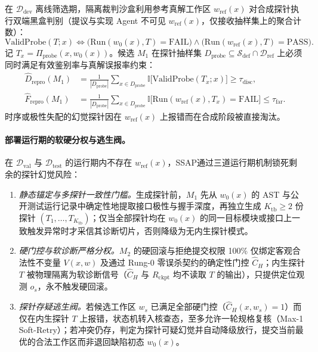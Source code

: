\documentclass[UTF8,a4paper,10.5pt]{ctexart}
\newcommand{\method}{SSAP}
\newcommand{\Ddev}{\mathcal{D}_{\mathrm{dev}}}
\newcommand{\Dval}{\mathcal{D}_{\mathrm{val}}}
\newcommand{\Dtest}{\mathcal{D}_{\mathrm{test}}}
\newcommand{\Ind}{\mathbb{I}}
\begin{document}
在 $\Ddev$ 离线筛选期，隔离裁判沙盒利用参考真解工作区 $w_{\mathrm{ref}}(x)$ 对合成探针执行双端黑盒判别（提议与实现 Agent 不可见 $w_{\mathrm{ref}}(x)$，仅接收抽样集上的聚合计数）：
\begin{equation}
  \mathrm{ValidProbe}(T; x) \iff
  \bigl(\mathrm{Run}(w_0(x), T) = \mathrm{FAIL}\bigr) \land
  \bigl(\mathrm{Run}(w_{\mathrm{ref}}(x), T) = \mathrm{PASS}\bigr).
  \label{eq:validprobe}
\end{equation}
记 $T_x=\Pi_{\mathrm{probe}}(x,w_0(x))$。候选 $M_1$ 在探针抽样集 $D_{\mathrm{probe}}\subseteq\mathcal{S}_{\mathrm{def}}\cap\mathcal{D}_{\mathrm{ref}}$ 上必须同时满足有效鉴别率与真解误报率约束：
\begin{align}
  \hat{D}_{\mathrm{repro}}(M_1) &= \frac{1}{|D_{\mathrm{probe}}|}\sum_{x\in D_{\mathrm{probe}}}\Ind\bigl[\mathrm{ValidProbe}(T_x;x)\bigr] \ge \tau_{\mathrm{disc}}, \\
  \hat{F}_{\mathrm{repro}}(M_1) &= \frac{1}{|D_{\mathrm{probe}}|}\sum_{x\in D_{\mathrm{probe}}}\Ind\bigl[\mathrm{Run}(w_{\mathrm{ref}}(x),T_x)=\mathrm{FAIL}\bigr] \le \tau_{\mathrm{far}}.
\end{align}
时序或极性失配的幻觉探针因在 $w_{\mathrm{ref}}(x)$ 上报错而在合成阶段被直接淘汰。

\paragraph{部署运行期的软硬分权与逃生阀。}
在 $\Dval$ 与 $\Dtest$ 的运行期内不存在 $w_{\mathrm{ref}}(x)$，\method{}通过三道运行期机制锁死剩余的探针幻觉风险：
\begin{enumerate}
  \item \emph{静态锚定与多探针一致性门槛。}生成探针前，$M_1$ 先从 $w_0(x)$ 的 AST 与公开测试运行记录中确定性地提取接口极性与握手深度，再独立生成 $K_{\mathrm{tb}}\ge 2$ 份探针 $(T_1,\dots,T_{K_{\mathrm{tb}}})$；仅当全部探针均在 $w_0(x)$ 的同一目标模块或接口上一致触发异常时才采信其诊断切片，否则降级为无内生探针模式。
  \item \emph{硬门控与软诊断严格分权。}$M_2$ 的硬回滚与拒绝提交权限 100\% 仅绑定客观合法性不变量 $V(x,w)$ 及通过 Rung-0 零误杀契约的确定性门控 $\hat{C}_H$；内生探针 $T$ 被物理隔离为软诊断信号（$\hat{C}_H$ 与 $R_{\mathrm{ckpt}}$ 均不读取 $T$ 的输出），只提供定位观测 $o_s$，永不触发硬回滚。
  \item \emph{探针存疑逃生阀。}若候选工作区 $w_s$ 已满足全部硬门控（$\hat{C}_H(x,w_s)=1$）而仅在内生探针 $T$ 上报错，状态机转入核查态，至多允许一轮规格复核（Max-1 Soft-Retry）；若冲突仍存，判定为探针可疑幻觉并自动降级放行，提交当前最优的合法工作区而非退回缺陷初态 $w_0(x)$。
\end{enumerate}
\end{document}
